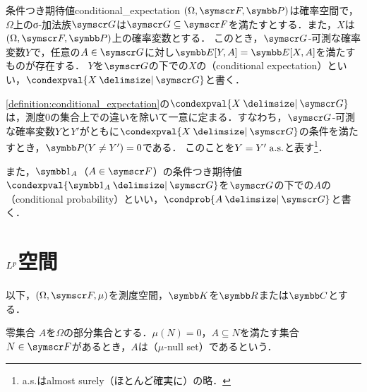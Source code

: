 \documentclass[../../main]{subfiles}
\begin{document}
\begin{definition}{条件つき期待値}{conditional_expectation}
  \((\Omega,\sigmaalg{F},\prob)\)は確率空間で，\(\Omega\)上のσ‐加法族\(\sigmaalg{G}\)は\(\sigmaalg{G}\subseteq\sigmaalg{F}\)を満たすとする．また，\(X\)は\((\Omega,\sigmaalg{F},\prob)\)上の確率変数とする．
  このとき，\(\sigmaalg{G}\)‐可測な確率変数\(Y\)で，任意の\(A\in\sigmaalg{G}\)に対し\(\expval[Y,A]=\expval[X,A]\)を満たすものが存在する\footnotemark ．
  \(Y\)を\(\sigmaalg{G}\)の下での\(X\)の（conditional expectation）といい，\(\condexpval{X\given\sigmaalg{G}}\)と書く．
\end{definition}
\cref{definition:conditional_expectation}の\(\condexpval{X\given\sigmaalg{G}}\)は，測度\(0\)の集合上での違いを除いて一意に定まる．すなわち，\(\sigmaalg{G}\)‐可測な確率変数\(Y\)と\(Y'\)がともに\(\condexpval{X\given\sigmaalg{G}}\)の条件を満たすとき，\(\prob(Y\neq Y')=0\)である．
このことを\(Y=Y'\almostsurely\)と表す\footnote{a{.}s{.}はalmost surely（ほとんど確実に）の略．}．

また，\(\indicator_A\)（\(A\in\sigmaalg{F}\)）の条件つき期待値\(\condexpval{\indicator_A\given\sigmaalg{G}}\)を\(\sigmaalg{G}\)の下での\(A\)の（conditional probability）といい，\(\condprob{A\given\sigmaalg{G}}\)と書く．

\section{\texorpdfstring{\(\Lebesgue{p}\)空間}{Lp空間}}

以下，\((\Omega,\sigmaalg{F},\mu)\)を測度空間，\(\numset{K}\)を\(\numset{R}\)または\(\numset{C}\)とする．

\begin{definition}{零集合}{}
  \(A\)を\(\Omega\)の部分集合とする．\(\mu(N)=0\)，\(A\subseteq N\)を満たす集合\(N\in\sigmaalg{F}\)があるとき，\(A\)は（\(\mu\)‐null set）であるという．
\end{definition}
\end{document}
